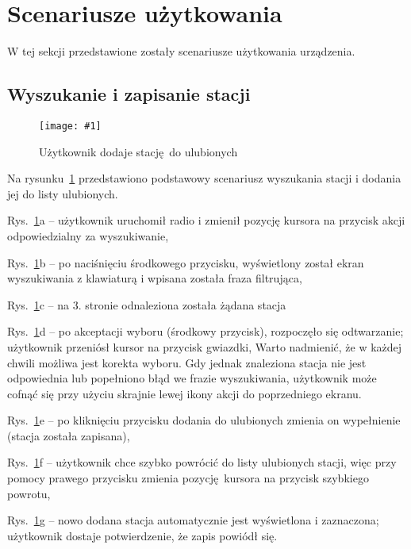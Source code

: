 \documentclass[polish]{aghengthesis}
\let\tempone\itemize
\let\temptwo\enditemize
\renewenvironment{itemize}{\tempone\setlength{\itemsep}{0cm}}{\temptwo}
\newcommand{\imgint}[4]{
	\begin{figure}[{#4}]
		\centering
		\texttt{[image: \#1]}
		\caption{#2}
		\label{#1}
	\end{figure}
}
\newcommand{\imgh}[3]{\imgint{#1}{#2}{#3}{H}}
\begin{document}
	\section{Scenariusze użytkowania}
		W tej sekcji przedstawione zostały scenariusze użytkowania urządzenia.
	
		\subsection{Wyszukanie i zapisanie stacji}
			\imgh{5/PicoRadio-fl-add}{Użytkownik dodaje stację do ulubionych}{0.9}
			\newcommand{\rfladd}[1]{\ref{5/PicoRadio-fl-add}#1}
			
			Na rysunku~\rfladd{} przedstawiono podstawowy scenariusz wyszukania stacji i dodania jej do listy ulubionych.
			
			\begin{itemize}
				\item Rys.~\rfladd{a} -- użytkownik uruchomił radio i zmienił pozycję kursora na przycisk akcji odpowiedzialny za wyszukiwanie,
				\item Rys.~\rfladd{b} -- po naciśnięciu środkowego przycisku, wyświetlony został ekran wyszukiwania z klawiaturą i wpisana została fraza filtrująca,
				\item Rys.~\rfladd{c} -- na 3. stronie odnaleziona została żądana stacja
				\item Rys.~\rfladd{d} -- po akceptacji wyboru (środkowy przycisk), rozpoczęło się odtwarzanie; użytkownik przeniósł kursor na przycisk gwiazdki,
			\end{itemize}
			Warto nadmienić, że w każdej chwili możliwa jest korekta wyboru. Gdy jednak znaleziona stacja nie jest odpowiednia lub popełniono błąd we frazie wyszukiwania, użytkownik może cofnąć się przy użyciu skrajnie lewej ikony akcji do poprzedniego ekranu.
			\begin{itemize}
				\item Rys.~\rfladd{e} -- po kliknięciu przycisku dodania do ulubionych zmienia on wypełnienie (stacja została zapisana),
				\item Rys.~\rfladd{f} -- użytkownik chce szybko powrócić do listy ulubionych stacji, więc przy pomocy prawego przycisku zmienia pozycję kursora na przycisk szybkiego powrotu,
				\item Rys.~\rfladd{g} -- nowo dodana stacja automatycznie jest wyświetlona i zaznaczona; użytkownik dostaje potwierdzenie, że zapis powiódł się.
			\end{itemize}
			
\end{document}
